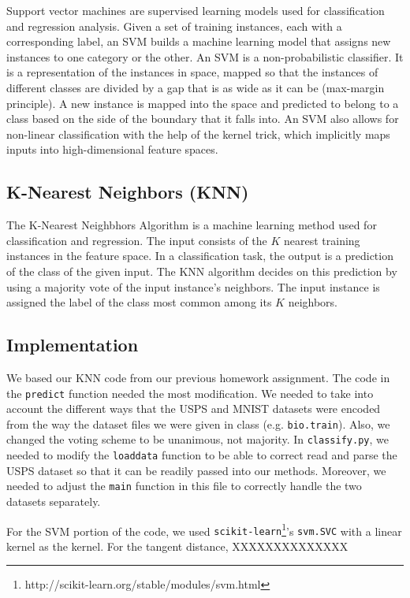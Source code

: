 \documentclass[11pt,letterpaper]{article}
\begin{document}
Support vector machines are supervised learning models used for classification and regression analysis. Given a set of training instances, each with a corresponding label, an SVM builds a machine learning model that assigns new instances to one category or the other. An SVM is a non-probabilistic classifier. It is a representation of the instances in space, mapped so that the instances of different classes are divided by a gap that is as wide as it can be (max-margin principle). A new instance is mapped into the space and predicted to belong to a class based on the side of the boundary that it falls into. An SVM also allows for non-linear classification with the help of the kernel trick, which implicitly maps inputs into high-dimensional feature spaces. 

\subsection{K-Nearest Neighbors (KNN)}

The K-Nearest Neighbhors Algorithm is a machine learning method used for classification and regression. The input consists of the $K$ nearest training instances in the feature space. In a classification task, the output is a prediction of the class of the given input. The KNN algorithm decides on this prediction by using a majority vote of the input instance's neighbors. The input instance is assigned the label of the class most common among its $K$ neighbors.

\subsection{Implementation}

We based our KNN code from our previous homework assignment. The code in the {\tt predict} function needed the most modification. We needed to take into account the different ways that the USPS and MNIST datasets were encoded from the way the dataset files we were given in class (e.g. {\tt bio.train}). Also, we changed the voting scheme to be unanimous, not majority. In {\tt classify.py}, we needed to modify the {\tt load\textunderscore data} function to be able to correct read and parse the USPS dataset so that it can be readily passed into our methods. Moreover, we needed to adjust the {\tt main} function in this file to correctly handle the two datasets separately.

For the SVM portion of the code, we used {\tt scikit-learn}\footnote{http://scikit-learn.org/stable/modules/svm.html}'s {\tt svm.SVC} with a linear kernel as the kernel. For the tangent distance, XXXXXXXXXXXXXX
\end{document}
